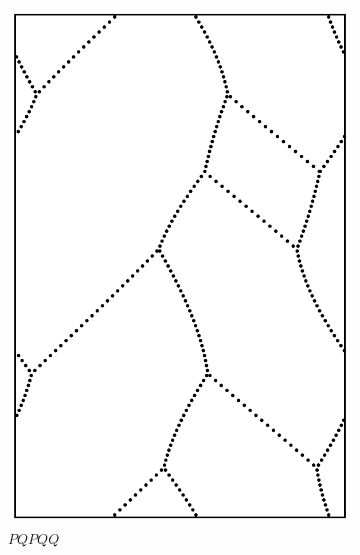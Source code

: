 \documentclass[12pt,twoside]{reedthesis}
\theoremstyle{definition}
\begin{document}
\begin{figure}[h]
\begin{subfigure}[t]{0.24\textwidth}
    \includegraphics[width=\textwidth]{figures/string_cheese_appendix/pqpqq.pdf}
    \caption*{$PQPQQ$}
    \vspace{5mm}
  \end{subfigure}
  \begin{subfigure}[t]{0.24\textwidth}

\end{subfigure}
\end{figure}
\end{document}
